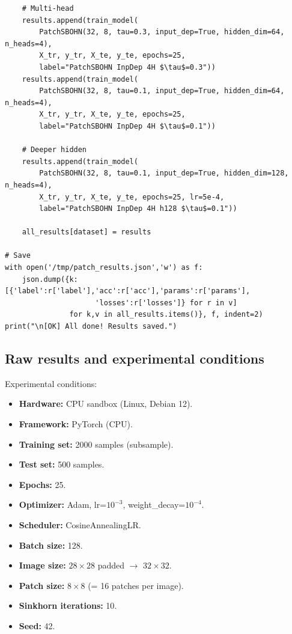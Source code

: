 \documentclass[11pt,a4paper]{report}
\begin{document}
\begin{small}
\begin{verbatim}
    # Multi-head
    results.append(train_model(
        PatchSBOHN(32, 8, tau=0.3, input_dep=True, hidden_dim=64, n_heads=4),
        X_tr, y_tr, X_te, y_te, epochs=25, 
        label="PatchSBOHN InpDep 4H $\tau$=0.3"))
    results.append(train_model(
        PatchSBOHN(32, 8, tau=0.1, input_dep=True, hidden_dim=64, n_heads=4),
        X_tr, y_tr, X_te, y_te, epochs=25, 
        label="PatchSBOHN InpDep 4H $\tau$=0.1"))
    
    # Deeper hidden
    results.append(train_model(
        PatchSBOHN(32, 8, tau=0.1, input_dep=True, hidden_dim=128, n_heads=4),
        X_tr, y_tr, X_te, y_te, epochs=25, lr=5e-4, 
        label="PatchSBOHN InpDep 4H h128 $\tau$=0.1"))
    
    all_results[dataset] = results

# Save
with open('/tmp/patch_results.json','w') as f:
    json.dump({k: [{'label':r['label'],'acc':r['acc'],'params':r['params'],
                     'losses':r['losses']} for r in v] 
               for k,v in all_results.items()}, f, indent=2)
print("\n[OK] All done! Results saved.")
\end{verbatim}
\end{small}

\subsection{Raw results and experimental conditions}

Experimental conditions:
\begin{itemize}
\item \textbf{Hardware:} CPU sandbox (Linux, Debian 12).
\item \textbf{Framework:} PyTorch (CPU).
\item \textbf{Training set:} 2000 samples (subsample).
\item \textbf{Test set:} 500 samples.
\item \textbf{Epochs:} 25.
\item \textbf{Optimizer:} Adam, lr=$10^{-3}$, weight\_decay=$10^{-4}$.
\item \textbf{Scheduler:} CosineAnnealingLR.
\item \textbf{Batch size:} 128.
\item \textbf{Image size:} $28{\times}28$ padded $\to$ $32{\times}32$.
\item \textbf{Patch size:} $8{\times}8$ (= 16 patches per image).
\item \textbf{Sinkhorn iterations:} 10.
\item \textbf{Seed:} 42.
\end{itemize}
\end{document}
